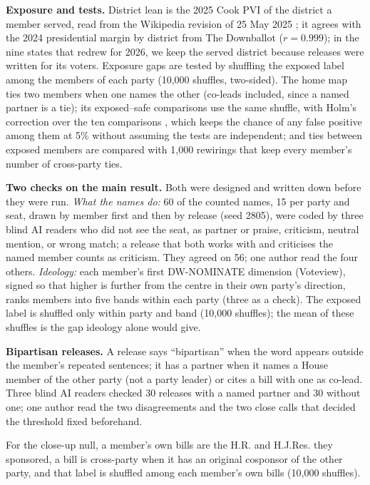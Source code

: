 \textbf{Exposure and tests.} District lean is the 2025 Cook PVI \cite{cook2025pvi} of the district a member served, read from the Wikipedia revision of 25 May 2025 \cite{wikipedia2025pvi}; it agrees with the 2024 presidential margin by district from The Downballot \cite{downballot2024} ($r = 0.999$); in the nine states that redrew for 2026, we keep the served district because releases were written for its voters. Exposure gaps are tested by shuffling the exposed label among the members of each party (10,000 shuffles, two-sided). The home map ties two members when one names the other (co-leads included, since a named partner is a tie); its exposed--safe comparisons use the same shuffle, with Holm's correction over the ten comparisons \cite{holm1979}, which keeps the chance of any false positive among them at 5\% without assuming the tests are independent; and ties between exposed members are compared with 1,000 rewirings that keep every member's number of cross-party ties.

\textbf{Two checks on the main result.} Both were designed and written down before they were run. \emph{What the names do:} 60 of the counted names, 15 per party and seat, drawn by member first and then by release (seed 2805), were coded by three blind AI readers who did not see the seat, as partner or praise, criticism, neutral mention, or wrong match; a release that both works with and criticises the named member counts as criticism. They agreed on 56; one author read the four others. \emph{Ideology:} each member's first DW-NOMINATE dimension (Voteview), signed so that higher is further from the centre in their own party's direction, ranks members into five bands within each party (three as a check). The exposed label is shuffled only within party and band (10,000 shuffles); the mean of these shuffles is the gap ideology alone would give.

\textbf{Bipartisan releases.} A release says ``bipartisan'' when the word appears outside the member's repeated sentences; it has a partner when it names a House member of the other party (not a party leader) or cites a bill with one as co-lead. Three blind AI readers checked 30 releases with a named partner and 30 without one; one author read the two disagreements and the two close calls that decided the threshold fixed beforehand.

For the close-up null, a member's own bills are the H.R. and H.J.Res. they sponsored, a bill is cross-party when it has an original cosponsor of the other party, and that label is shuffled among each member's own bills (10,000 shuffles).
